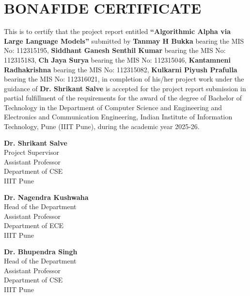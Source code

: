 \documentclass[12pt, a4paper]{report}
\begin{document}



\newpage
\chapter*{BONAFIDE CERTIFICATE}

This is to certify that the project report entitled \textbf{“Algorithmic Alpha via Large Language Models”} submitted by \textbf{Tanmay H Bukka} bearing the MIS No: 112315195, \textbf{Siddhant Ganesh Senthil Kumar} bearing the MIS No: 112315183, \textbf{Ch Jaya Surya} bearing the MIS No: 112315046, \textbf{Kantamneni Radhakrishna} bearing the MIS No: 112315082, \textbf{Kulkarni Piyush Prafulla} bearing the MIS No: 112316021, in completion of his/her project work under the guidance of \textbf{Dr. Shrikant Salve} is accepted for the project report submission in partial fulfillment of the requirements for the award of the degree of Bachelor of Technology in the Department of Computer Science and Engineering and Electronics and Communication Engineering, Indian Institute of Information Technology, Pune (IIIT Pune), during the academic year 2025-26.

\vspace{3cm}

\noindent
\begin{minipage}[t]{0.32\textwidth}
    \textbf{Dr. Shrikant Salve} \\
    Project Supervisor \\
    Assistant Professor \\
    Department of CSE \\
    IIIT Pune
\end{minipage}
\hfill
\begin{minipage}[t]{0.32\textwidth}
    \textbf{Dr. Nagendra Kushwaha} \\
    Head of the Department \\
    Assistant Professor \\
    Department of ECE \\
    IIIT Pune
\end{minipage}
\hfill
\begin{minipage}[t]{0.32\textwidth}
    \textbf{Dr. Bhupendra Singh} \\
    Head of the Department \\
    Assistant Professor \\
    Department of CSE \\
    IIIT Pune
\end{minipage}
\vspace{2cm}
\end{document}
